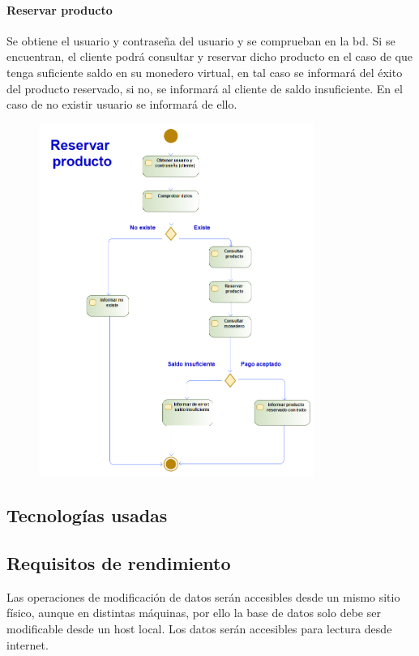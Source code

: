 \paragraph{Reservar producto}
Se obtiene el usuario y contraseña del usuario y se comprueban en la \gls{bd}. Si se encuentran, el cliente podrá consultar y reservar dicho producto en el caso de que tenga suficiente saldo en su monedero virtual, en tal caso se informará del éxito del producto reservado, si no, se informará al cliente de saldo insuficiente. En el caso de no existir usuario se informará de ello.
\begin{figure}[H]
    \centering
    \includegraphics[width=0.8\textwidth]{Use_Cases/reservar_producto.png}
\end{figure}
\subsection{Tecnologías usadas}
\subsection{Requisitos de rendimiento}
Las operaciones de modificación de datos serán accesibles desde un mismo sitio físico, aunque en distintas máquinas, por ello la base de datos solo debe ser modificable desde un \gls{host} local. Los datos serán accesibles para lectura desde internet.
